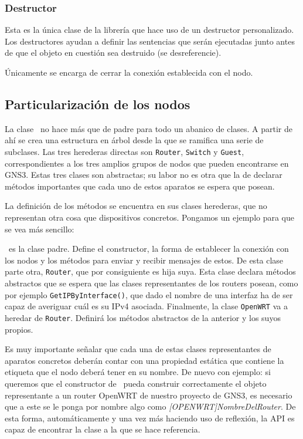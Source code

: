 \subsubsection{Destructor}
Esta es la única clase de la librería que hace uso de un destructor personalizado. Los destructores ayudan a definir las sentencias que serán ejecutadas junto antes de que el objeto en cuestión sea destruido (se desreferencie).

Únicamente se encarga de cerrar la conexión establecida con el nodo.

\subsection{Particularización de los nodos}
La clase \NODE~no hace más que de padre para todo un abanico de clases. A partir de ahí se crea una estructura en árbol desde la que se ramifica una serie de subclases. Las tres herederas directas son \texttt{Router}, \texttt{Switch} y \texttt{Guest}, correspondientes a los tres amplios grupos de nodos que pueden encontrarse en GNS3. Estas tres clases son abstractas; su labor no es otra que la de declarar métodos importantes que cada uno de estos aparatos se espera que posean.

La definición de los métodos se encuentra en sus clases herederas, que no representan otra cosa que dispositivos concretos. Pongamos un ejemplo para que se vea más sencillo:

\NODE~es la clase padre. Define el constructor, la forma de establecer la conexión con los nodos y los métodos para enviar y recibir mensajes de estos. De esta clase parte otra, \texttt{Router}, que por consiguiente es hija suya. Esta clase declara métodos abstractos que se espera que las clases representantes de los routers posean, como por ejemplo \texttt{GetIPByInterface()}, que dado el nombre de una interfaz ha de ser capaz de averiguar cuál es su IPv4 asociada. Finalmente, la clase \texttt{OpenWRT} va a heredar de \texttt{Router}. Definirá los métodos abstractos de la anterior y los suyos propios.

Es muy importante señalar que cada una de estas clases representantes de aparatos concretos deberán contar con una propiedad estática que contiene la etiqueta que el nodo deberá tener en su nombre. De nuevo con ejemplo: si queremos que el constructor de \GNSCS~pueda construir correctamente el objeto representante a un router OpenWRT de nuestro proyecto de GNS3, es necesario que a este se le ponga por nombre algo como \textit{[OPENWRT]NombreDelRouter}. De esta forma, automáticamente y una vez más haciendo uso de reflexión, la API es capaz de encontrar la clase a la que se hace referencia.

